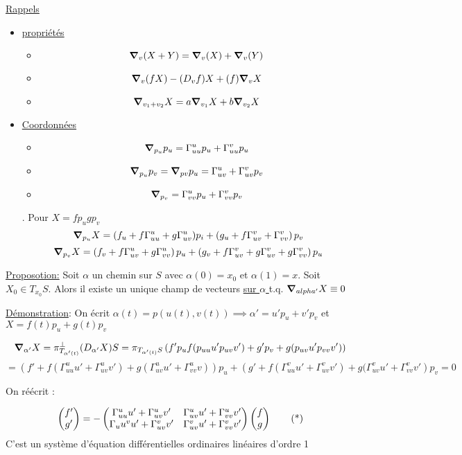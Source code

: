 



\underline{Rappels} 

\begin{itemize}
	\item \underline{propriétés} 
		\begin{itemize}
			\item $$\grad_{v}(X+Y) = \grad_{v} (X) + \grad_{v} (Y)$$
			\item $$\grad_v(fX) - (D_{v} f)X + (f) \grad_{v} X$$
			\item $$\grad_{v_1+v_2} X = a \grad_{v_1} X + b\grad_{v_2} X$$
		\end{itemize}
	\item \underline{Coordonnées} 
		\begin{itemize}
			\item$$\grad_{p_u} p_{u} = \Gamma_{uu}^u p_{u} + \Gamma_{uu}^v p_u$$
			\item $$\grad_{p_u} p_{v} = \grad_{pv} p_{u} = \Gamma_{uv}^u + \Gamma_{uv}^v p_{v}$$ 
			\item $$\grad_{p_v} = \Gamma_{vv}^u p_{u} + \Gamma_{vv}^v p_{v}$$ 
		\end{itemize}. Pour $X=fp_{u} gp_{v} $ $$\grad_{p_u} X = (f_{u} + f\Gamma_{uu}^u + g\Gamma_{uv}^u) p_{i} + \left( g_{u} + f\Gamma_{uv}^v + \Gamma_{vv}^v \right) p_v$$ $$\grad_{p_v} X = \left( f_{v} +f \Gamma_{uv}^u + g\Gamma_{vv}^u \right) p_{u} + \left( g_{v} +f\Gamma_{uv}^v + g\Gamma_{uv}^v + g\Gamma_{vv}^v \right) p_{u} $$  
\end{itemize}


\underline{Proposotion:} Soit $\alpha$ un chemin sur $S$ avec $\alpha(0)=x_0$ et $\alpha(1)=x$. Soit $X_{0} \in T_{x_0} S$. Alors il existe un unique champ de vecteurs \underline{sur $\alpha$ } t.q. $\grad_{alpha'} X \equiv 0$    

\underline{Démonstration}: On écrit $\alpha(t) = p(u(t),v(t))\implies \alpha'= u'p_{u} +v'p_{v} $ et $X = f(t)p_{u} +g(t) p_{v} $   

$$\grad_{\alpha'} X = \pi_{T_{\alpha'(t)}}^\perp(D_{\alpha'} X) S = \pi_{T_{\alpha'(t)}S} \left( f'p_{u} f(p_{uu} u' p_{uv} v') + g' p_{v} +g(p_{uv} u' p_{vv} v') \right) $$ 
$$= \left( f'+f(\Gamma_{uu}^u u' + \Gamma_{uv}^u v') + g(\Gamma_{uv}^u u' + \Gamma_{vv}^u v) \right)  p_{u} + \left( g' + f(\Gamma_{uu}^v u' + \Gamma_{uv}^v v') + g(\Gamma_{uv}^v u' + \Gamma_{vv}^v v' \right) p_{v} =0$$ 

On réécrit :

\begin{equation*}
	\begin{pmatrix} f'\\g' \end{pmatrix} = -\begin{pmatrix} \Gamma_{uu}^u u' + \Gamma_{uv}^u v' & \Gamma_{uv}^u u' + \Gamma_{vv}^u v'\\ \Gamma_uu^v u' + \Gamma_{uv}^v v' & \Gamma_{uv}^v u' + \Gamma_{vv}^v v' \end{pmatrix}\begin{pmatrix} f\\g \end{pmatrix}\tag{*}\label{eq:transp} 
\end{equation*}
C'est un système d'équation différentielles ordinaires linéaires d'ordre 1


